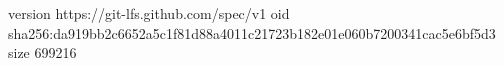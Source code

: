 version https://git-lfs.github.com/spec/v1
oid sha256:da919bb2c6652a5c1f81d88a4011c21723b182e01e060b7200341cac5e6bf5d3
size 699216
